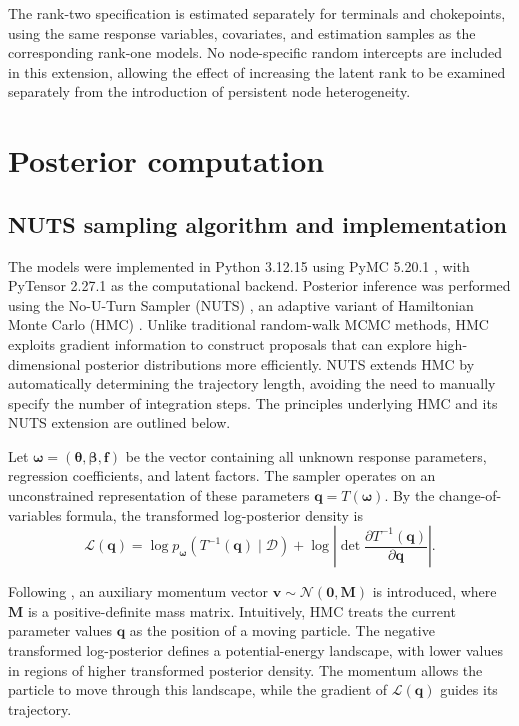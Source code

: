 \documentclass[pdftex,12pt,openright,a4paper,oneside]{book}
\begin{document}
The rank-two specification is estimated separately for terminals and chokepoints, using the same response variables, covariates, and estimation samples as the corresponding rank-one models. 
No node-specific random intercepts are included in this extension, allowing the effect of increasing the latent rank to be examined separately from the introduction of persistent node heterogeneity.

\section{Posterior computation}
\label{sec:posterior_computation}

\subsection{NUTS sampling algorithm and implementation}
\label{subsec:posterior_sampling}

The models were implemented in Python 3.12.15 using
PyMC 5.20.1 \citep{abrilpla2023pymc}, with PyTensor 2.27.1
as the computational backend. Posterior inference was
performed using the No-U-Turn Sampler (NUTS)
\citep{hoffman2014no}, an adaptive variant of Hamiltonian
Monte Carlo (HMC) \citep{neal2011mcmc}. Unlike traditional
random-walk MCMC methods, HMC exploits gradient
information to construct proposals that can explore
high-dimensional posterior distributions more efficiently.
NUTS extends HMC by automatically determining the
trajectory length, avoiding the need to manually specify
the number of integration steps.
The principles underlying
HMC and its NUTS extension are outlined below.

Let $\boldsymbol{\omega}
=(\boldsymbol{\theta},\boldsymbol{\beta},\mathbf{f})$
be the vector containing all unknown response parameters, regression
coefficients, and latent factors. 
The sampler operates on an unconstrained
representation of these parameters $\mathbf{q}=T(\boldsymbol{\omega})$.
By the change-of-variables formula, the transformed
log-posterior density is
\begin{equation}
\mathcal{L}(\mathbf{q})
=
\log p_{\boldsymbol{\omega}}\!\left(
T^{-1}(\mathbf{q})\mid\mathcal{D}
\right)
+
\log\left|
\det\frac{\partial T^{-1}(\mathbf{q})}
{\partial\mathbf{q}}
\right|.
\end{equation}

Following \citet{neal2011mcmc}, an auxiliary momentum
vector $\mathbf{v}\sim\mathcal{N}(\mathbf{0},\mathbf{M})$
is introduced, where $\mathbf{M}$ is a positive-definite
mass matrix. Intuitively, HMC treats the current parameter values
$\mathbf{q}$ as the position of a moving particle.
The negative transformed
log-posterior defines a potential-energy landscape,
with lower values in regions of higher transformed
posterior density. The momentum allows the particle
to move through this landscape, while the gradient
of $\mathcal{L}(\mathbf{q})$ guides its trajectory.
\end{document}
